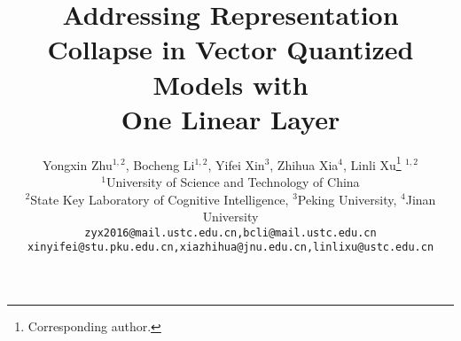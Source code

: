 \documentclass[10pt,twocolumn,letterpaper]{article}
\title{Addressing Representation Collapse in Vector Quantized Models with \\One Linear Layer}
\author{Yongxin Zhu$^{1,2}$, Bocheng Li$^{1,2}$, Yifei Xin$^{3}$, Zhihua Xia$^{4}$, Linli Xu\thanks{Corresponding author.}$^{~~1,2}$\\
$^{1}$University of Science and Technology of China \\
$^{2}$State Key Laboratory of Cognitive Intelligence, $^{3}$Peking University, $^{4}$Jinan University\\
\texttt{zyx2016@mail.ustc.edu.cn,bcli@mail.ustc.edu.cn}\\
\texttt{xinyifei@stu.pku.edu.cn,xiazhihua@jnu.edu.cn,linlixu@ustc.edu.cn}
}
\begin{document}
\maketitle
    


%
{
    \small
    
    
}


\end{document}
